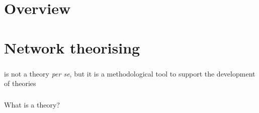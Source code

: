 \documentclass[8pt]{beamer}
\begin{document}
\section*{Overview}

\begin{frame}
\frametitle{\insertsection}
\tableofcontents[hideallsubsections]
\end{frame}






\section{Network theorising}


\bgroup
{}
\begin{frame}[plain]{}
\begin{center}
\color{white}{\Huge\insertsection}
\end{center}
\end{frame}
\egroup




\begin{frame}
\frametitle{\insertsection}

{\color{blue}{Network analysis}} is not a theory \textit{per se}, but it is a methodological tool to support the development of theories \cite{Borgatti2011}

\end{frame}


\begin{frame}
\frametitle{\insertsection}

\centering
\Large What is a theory?

\end{frame}

\end{document}
